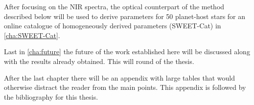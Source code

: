 After focusing on the NIR spectra, the optical counterpart of the method described below will be
used to derive parameters for 50 planet-host stars for an online catalogue of homogeneously derived
parameters (SWEET-Cat) in \cref{cha:SWEET-Cat}.

Last in \cref{cha:future} the future of the work established here will be discussed along with the
results already obtained. This will round of the thesis.

After the last chapter there will be an appendix with large tables that would otherwise distract the
reader from the main points. This appendix is followed by the bibliography for this thesis.

